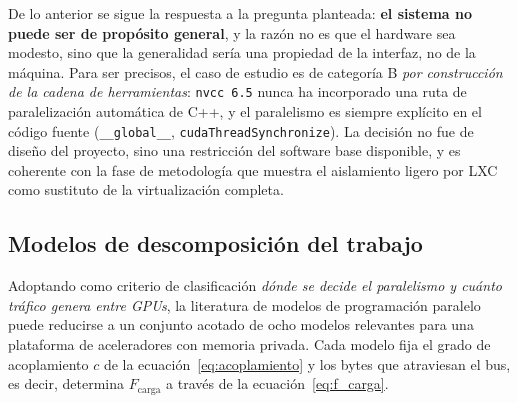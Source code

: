 \documentclass[a4paper,11pt]{article}
\begin{document}
De lo anterior se sigue la respuesta a la pregunta planteada: \textbf{el sistema no puede ser de propósito general}, y la razón
no es que el hardware sea modesto, sino que la generalidad sería una propiedad de la interfaz, no de la máquina. Para ser
precisos, el caso de estudio es de categoría B \emph{por construcción de la cadena de herramientas}: \texttt{nvcc 6.5} nunca ha
incorporado una ruta de paralelización automática de C++, y el paralelismo es siempre explícito en el código fuente
(\texttt{\_\_global\_\_}, \texttt{cudaThreadSynchronize}). La decisión no fue de diseño del proyecto, sino una restricción del
software base disponible, y es coherente con la fase de metodología que muestra el aislamiento ligero por LXC como
sustituto de la virtualización completa.

\subsection*{Modelos de descomposición del trabajo}

Adoptando como criterio de clasificación \emph{dónde se decide el paralelismo y cuánto tráfico genera entre GPUs}, la literatura
de modelos de programación paralelo~\cite{skillicorn1998,ng2011} puede reducirse a un conjunto acotado de ocho modelos
relevantes para una plataforma de aceleradores con memoria privada. Cada modelo fija el grado de acoplamiento $c$ de
la ecuación~\eqref{eq:acoplamiento} y los bytes que atraviesan el bus, es decir, determina $F_{\text{carga}}$ a través de la
ecuación~\eqref{eq:f_carga}.
\end{document}
